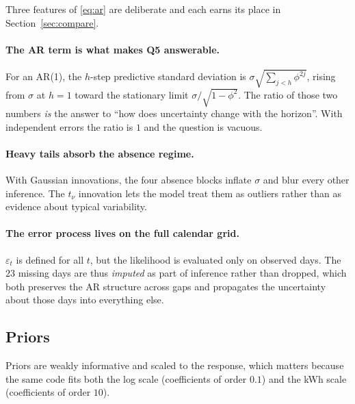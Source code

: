\documentclass[11pt]{article}
\begin{document}
Three features of \eqref{eq:ar} are deliberate and each earns its place in
Section~\ref{sec:compare}.

\paragraph{The AR term is what makes Q5 answerable.} For an AR(1), the $h$-step
predictive standard deviation is
$\sigma\sqrt{\sum_{j<h}\phi^{2j}}$, rising from $\sigma$ at $h=1$ toward the
stationary limit $\sigma/\sqrt{1-\phi^2}$. The ratio of those two numbers
\emph{is} the answer to ``how does uncertainty change with the horizon''. With
independent errors the ratio is $1$ and the question is vacuous.

\paragraph{Heavy tails absorb the absence regime.} With Gaussian innovations,
the four absence blocks inflate $\sigma$ and blur every other inference. The
$t_\nu$ innovation lets the model treat them as outliers rather than as
evidence about typical variability.

\paragraph{The error process lives on the full calendar grid.} $\varepsilon_t$
is defined for all $t$, but the likelihood is evaluated only on observed days.
The $23$ missing days are thus \emph{imputed} as part of inference rather than
dropped, which both preserves the AR structure across gaps and propagates the
uncertainty about those days into everything else.

\subsection{Priors}

Priors are weakly informative and scaled to the response, which matters because
the same code fits both the log scale (coefficients of order $0.1$) and the kWh
scale (coefficients of order $10$).
\end{document}
